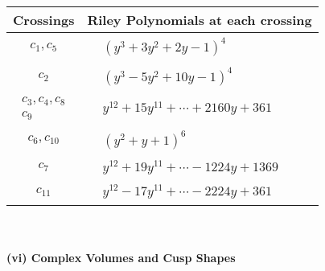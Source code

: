 \documentclass[1p]{elsarticle_modified}
\theoremstyle{definition}
\begin{document}
\begin{tabular}{m{50pt}|m{274pt}}
Crossings & \hspace{64pt}Riley Polynomials at each crossing \\
\hline $$\begin{aligned}c_{1},c_{5}\end{aligned}$$&$\begin{aligned}
&(y^3+3 y^2+2 y-1)^4
\end{aligned}$\\
\hline $$\begin{aligned}c_{2}\end{aligned}$$&$\begin{aligned}
&(y^3-5 y^2+10 y-1)^4
\end{aligned}$\\
\hline $$\begin{aligned}c_{3},c_{4},c_{8}\\c_{9}\end{aligned}$$&$\begin{aligned}
&y^{12}+15 y^{11}+\cdots+2160 y+361
\end{aligned}$\\
\hline $$\begin{aligned}c_{6},c_{10}\end{aligned}$$&$\begin{aligned}
&(y^2+y+1)^6
\end{aligned}$\\
\hline $$\begin{aligned}c_{7}\end{aligned}$$&$\begin{aligned}
&y^{12}+19 y^{11}+\cdots-1224 y+1369
\end{aligned}$\\
\hline $$\begin{aligned}c_{11}\end{aligned}$$&$\begin{aligned}
&y^{12}-17 y^{11}+\cdots-2224 y+361
\end{aligned}$\\
\hline
\end{tabular}\\~\\
\newpage\flushleft \textbf{(vi) Complex Volumes and Cusp Shapes}
\end{document}

